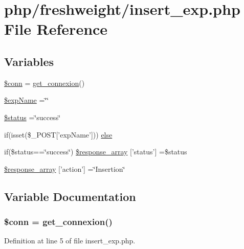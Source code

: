 \hypertarget{insert__exp_8php}{\section{php/freshweight/insert\-\_\-exp.php File Reference}
\label{insert__exp_8php}
}
\subsection*{Variables}
\begin{DoxyCompactItemize}
\item 
\hyperlink{insert__exp_8php_aa8a5a87b9c1a6a0819b88447cbe41877}{\$conn} = \hyperlink{php__functions_8php_ace18bc10f3fd08f92688ac743e0d8c2e}{get\-\_\-connexion}()
\item 
\hyperlink{insert__exp_8php_a6478e66386fefd0e5fd6de22d695ffca}{\$exp\-Name} =\char`\"{}\char`\"{}
\item 
\hyperlink{insert__exp_8php_a58391ea75f2d29d5d708d7050b641c33}{\$status} =\char`\"{}success\char`\"{}
\item 
if(isset(\$\-\_\-\-P\-O\-S\-T\mbox{[}'exp\-Name'\mbox{]})) \hyperlink{insert__exp_8php_a52448dd09a6db2ed5bf840e135b80fbe}{else}
\item 
if(\$status==\char`\"{}success\char`\"{}) \hyperlink{insert__exp_8php_ac2f977cd15bb8f414765415d0c35971d}{\$response\-\_\-array} \mbox{[}'status'\mbox{]} =\$status
\item 
\hyperlink{insert__exp_8php_ae768978a0cdc416c0d63d798c85c8784}{\$response\-\_\-array} \mbox{[}'action'\mbox{]} =\char`\"{}Insertion\char`\"{}
\end{DoxyCompactItemize}


\subsection{Variable Documentation}
\hypertarget{insert__exp_8php_aa8a5a87b9c1a6a0819b88447cbe41877}{
\subsubsection[{\$conn}]{\setlength{\rightskip}{0pt plus 5cm}\$conn = {\bf get\-\_\-connexion}()}}\label{insert__exp_8php_aa8a5a87b9c1a6a0819b88447cbe41877}


Definition at line 5 of file insert\-\_\-exp.\-php.


